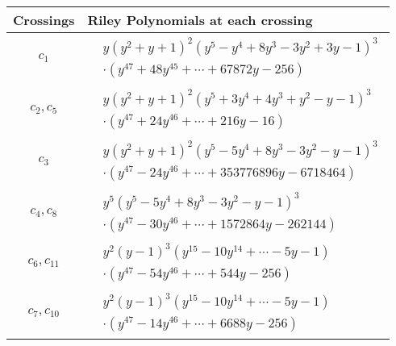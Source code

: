 \documentclass[1p]{elsarticle_modified}
\theoremstyle{definition}
\begin{document}
\begin{tabular}{m{50pt}|m{274pt}}
Crossings & \hspace{64pt}Riley Polynomials at each crossing \\
\hline $$\begin{aligned}c_{1}\end{aligned}$$&$\begin{aligned}
&y(y^2+y+1)^2(y^5- y^4+8 y^3-3 y^2+3 y-1)^3\\
&\cdot(y^{47}+48 y^{45}+\cdots+67872 y-256)
\end{aligned}$\\
\hline $$\begin{aligned}c_{2},c_{5}\end{aligned}$$&$\begin{aligned}
&y(y^2+y+1)^2(y^5+3 y^4+4 y^3+y^2- y-1)^3\\
&\cdot(y^{47}+24 y^{46}+\cdots+216 y-16)
\end{aligned}$\\
\hline $$\begin{aligned}c_{3}\end{aligned}$$&$\begin{aligned}
&y(y^2+y+1)^2(y^5-5 y^4+8 y^3-3 y^2- y-1)^3\\
&\cdot(y^{47}-24 y^{46}+\cdots+353776896 y-6718464)
\end{aligned}$\\
\hline $$\begin{aligned}c_{4},c_{8}\end{aligned}$$&$\begin{aligned}
&y^5(y^5-5 y^4+8 y^3-3 y^2- y-1)^3\\
&\cdot(y^{47}-30 y^{46}+\cdots+1572864 y-262144)
\end{aligned}$\\
\hline $$\begin{aligned}c_{6},c_{11}\end{aligned}$$&$\begin{aligned}
&y^2(y-1)^3(y^{15}-10 y^{14}+\cdots-5 y-1)\\
&\cdot(y^{47}-54 y^{46}+\cdots+544 y-256)
\end{aligned}$\\
\hline $$\begin{aligned}c_{7},c_{10}\end{aligned}$$&$\begin{aligned}
&y^2(y-1)^3(y^{15}-10 y^{14}+\cdots-5 y-1)\\
&\cdot(y^{47}-14 y^{46}+\cdots+6688 y-256)
\end{aligned}$\\

\end{tabular}
\end{document}
